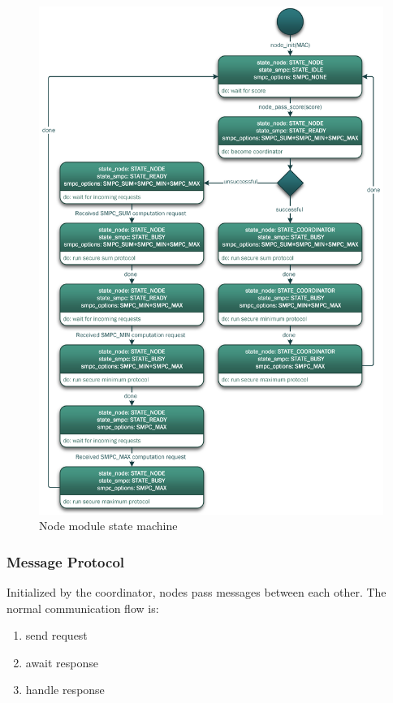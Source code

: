 \begin{figure}[!htbp] %
	\caption{Node module state machine} \label{Node module state machine}
	\includegraphics[scale=1.0]{figures/node_states.png}
\end{figure}

\subsubsection{Message Protocol} \label{Message Protocol}

Initialized by the coordinator, nodes pass messages between each other.
The normal communication flow is:
\begin{enumerate}
	\item send request
	\item await response
	\item handle response
\end{enumerate}

